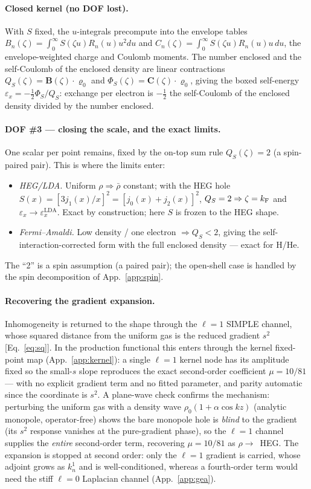 \paragraph*{Closed kernel (no DOF lost).}
With $S$ fixed, the $u$-integrals precompute into the envelope tables
$B_n(\zeta)=\int_0^\infty S(\zeta u)R_n(u)u^2du$ and
$C_n(\zeta)=\int_0^\infty S(\zeta u)R_n(u)u\,du$, the envelope-weighted charge and Coulomb moments.
The number enclosed and the self-Coulomb of the enclosed density are linear contractions
$Q_S(\zeta)=\mathbf B(\zeta)\!\cdot\!\bm\varrho_0$ and
$\Phi_S(\zeta)=\mathbf C(\zeta)\!\cdot\!\bm\varrho_0$,
giving the boxed self-energy $\varepsilon_x=-\tfrac12\Phi_S/Q_S$: exchange per electron is $-\tfrac12$ the self-Coulomb of
the enclosed density divided by the number enclosed.

\paragraph*{DOF \#3 --- closing the scale, and the exact limits.}
One scalar per point remains, fixed by the on-top sum rule $Q_S(\zeta)=2$ (a
spin-paired pair). This is where the limits enter:
\begin{itemize}
\item \emph{HEG/LDA.} Uniform $\rho\Rightarrow\bar\rho$ constant; with the HEG hole
$S(x)=[3j_1(x)/x]^2=[j_0(x)+j_2(x)]^2$, $Q_S=2\Rightarrow \zeta=k_{\mathrm{F}}$ and
$\varepsilon_x\to\varepsilon_x^{\mathrm{LDA}}$. Exact by construction; here $S$ is
frozen to the HEG shape.
\item \emph{Fermi--Amaldi.} Low density / one electron $\Rightarrow Q_S<2$,
giving the self-interaction-corrected form with the full enclosed density --- exact
for H/He.
\end{itemize}
The ``2'' is a spin assumption (a paired pair); the open-shell case is handled by
the spin decomposition of App.~\ref{app:spin}.

\paragraph*{Recovering the gradient expansion.}
Inhomogeneity is returned to the shape through the $\ell=1$ SIMPLE channel, whose squared distance
from the uniform gas is the reduced gradient $s^2$ [Eq.~\eqref{eq:sq}]. In the production functional
this enters through the kernel fixed-point map (App.~\ref{app:kernel}): a single $\ell=1$ kernel node
has its amplitude fixed so the small-$s$ slope reproduces the exact second-order coefficient
$\mu=10/81$ --- with no explicit gradient term and no fitted parameter, and parity automatic since
the coordinate is $s^2$. A plane-wave check confirms the mechanism: perturbing the uniform gas with a
density wave $\rho_0(1+\alpha\cos kz)$ (analytic monopole, operator-free) shows the bare monopole
hole is \emph{blind} to the gradient (its $s^2$ response vanishes at the pure-gradient phase), so the
$\ell=1$ channel supplies the \emph{entire} second-order term, recovering $\mu=10/81$ as
$\rho\to$~HEG. The expansion is stopped at second order: only the $\ell=1$ gradient is carried, whose
adjoint grows as $k_n^1$ and is well-conditioned, whereas a fourth-order term would need the stiff
$\ell=0$ Laplacian channel (App.~\ref{app:gea}).

